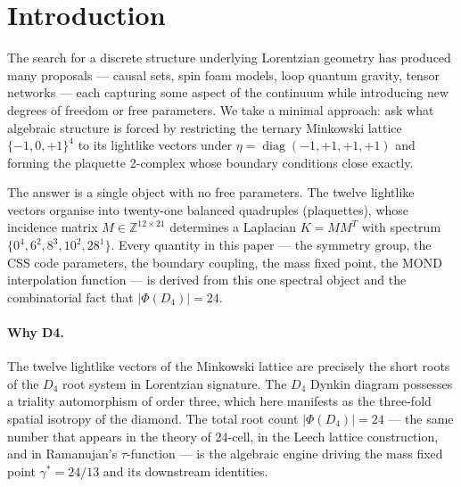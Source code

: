 \documentclass[12pt,a4paper]{article}
\theoremstyle{plain}
\theoremstyle{definition}
\newcommand{\Z}{\mathbb{Z}}
\newcommand{\gstar}{\gamma^{*}}
\DeclareMathOperator{\diag}{diag}
\begin{document}
\tableofcontents
\newpage

\section{Introduction}
\label{sec:intro}

The search for a discrete structure underlying Lorentzian geometry has
produced many proposals — causal sets, spin foam models, loop quantum gravity,
tensor networks — each capturing some aspect of the continuum while introducing
new degrees of freedom or free parameters.  We take a minimal approach: ask
what algebraic structure is forced by restricting the ternary Minkowski lattice
$\{-1,0,+1\}^4$ to its lightlike vectors under
$\eta = \diag(-1,+1,+1,+1)$ and forming the plaquette 2-complex whose
boundary conditions close exactly.

The answer is a single object with no free parameters.  The twelve lightlike
vectors organise into twenty-one balanced quadruples (plaquettes), whose
incidence matrix $M \in \Z^{12\times 21}$ determines a Laplacian
$K = MM^T$ with spectrum $\{0^4, 6^2, 8^3, 10^2, 28^1\}$.  Every
quantity in this paper — the symmetry group, the CSS code parameters,
the boundary coupling, the mass fixed point, the MOND interpolation
function — is derived from this one spectral object and the combinatorial
fact that $|\Phi(D_4)| = 24$.

\paragraph{Why D4.}
The twelve lightlike vectors of the Minkowski lattice are precisely the
short roots of the $D_4$ root system in Lorentzian signature.  The $D_4$
Dynkin diagram possesses a triality automorphism of order three, which
here manifests as the three-fold spatial isotropy of the diamond.  The
total root count $|\Phi(D_4)| = 24$ — the same number that appears
in the theory of 24-cell, in the Leech lattice construction, and in
Ramanujan's $\tau$-function — is the algebraic engine driving the mass
fixed point $\gstar = 24/13$ and its downstream identities.
\end{document}

